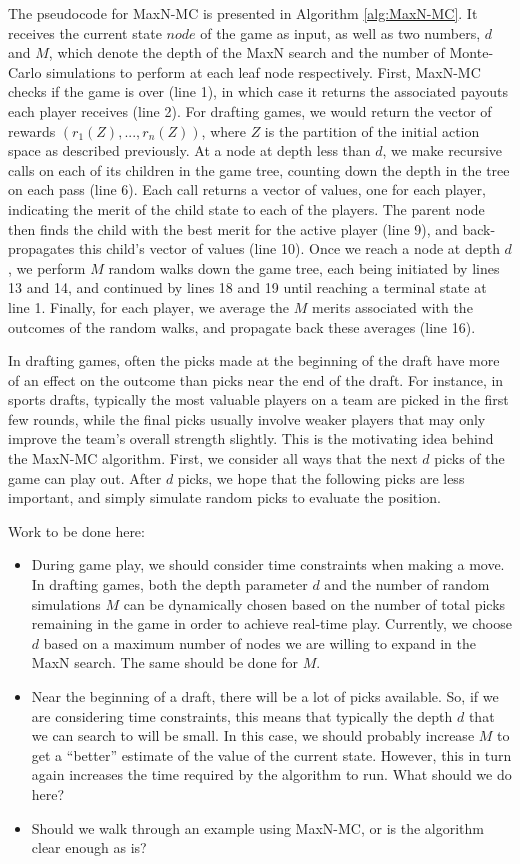 \documentclass[letterpaper]{article}
\numberwithin{equation}{section}
\numberwithin{theorem}{section}
\numberwithin{lemma}{section}
\numberwithin{df}{section}
\begin{document}
The pseudocode for MaxN-MC is presented in Algorithm \ref{alg:MaxN-MC}.  It receives the current state $node$ of the game as input, as well as two numbers, $d$ and $M$, which denote the depth of the MaxN search and the number of Monte-Carlo simulations to perform at each leaf node respectively.  First, MaxN-MC checks if the game is over (line 1), in which case it returns the associated payouts each player receives (line 2).  For drafting games, we would return the vector of rewards $(r_1(Z), ..., r_n(Z))$, where $Z$ is the partition of the initial action space as described previously.  At a node at depth less than $d$, we make recursive calls on each of its children in the game tree, counting down the depth in the tree on each pass (line 6).  Each call returns a vector of values, one for each player, indicating the merit of the child state to each of the players.  The parent node then finds the child with the best merit for the active player (line 9), and back-propagates this child's vector of values (line 10).  Once we reach a node at depth $d$, we perform $M$ random walks down the game tree, each being initiated by lines 13 and 14, and continued by lines 18 and 19 until reaching a terminal state at line 1.  Finally, for each player, we average the $M$ merits associated with the outcomes of the random walks, and propagate back these averages (line 16).

In drafting games, often the picks made at the beginning of the draft have more of an effect on the outcome than picks near the end of the draft.  For instance, in sports drafts, typically the most valuable players on a team are picked in the first few rounds, while the final picks usually involve weaker players that may only improve the team's overall strength slightly.  This is the motivating idea behind the MaxN-MC algorithm.  First, we consider all ways that the next $d$ picks of the game can play out.  After $d$ picks, we hope that the following picks are less important, and simply simulate random picks to evaluate the position.

Work to be done here:
\begin{itemize}
	\item During game play, we should consider time constraints when making a move.  In drafting games, both the depth parameter $d$ and the number of random simulations $M$ can be dynamically chosen based on the number of total picks remaining in the game in order to achieve real-time play.  Currently, we choose $d$ based on a maximum number of nodes we are willing to expand in the MaxN search.  The same should be done for $M$.
	\item Near the beginning of a draft, there will be a lot of picks available.  So, if we are considering time constraints, this means that typically the depth $d$ that we can search to will be small.  In this case, we should probably increase $M$ to get a ``better'' estimate of the value of the current state.  However, this in turn again increases the time required by the algorithm to run.  What should we do here?
	\item Should we walk through an example using MaxN-MC, or is the algorithm clear enough as is?
\end{itemize}
\end{document}
